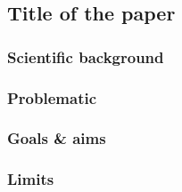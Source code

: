\subsection{Title of the paper \citep{ref}}
\label{task:@label}

\subsubsection{Scientific background}

\subsubsection{Problematic}

\subsubsection{Goals \& aims}

\subsubsection{Limits}






